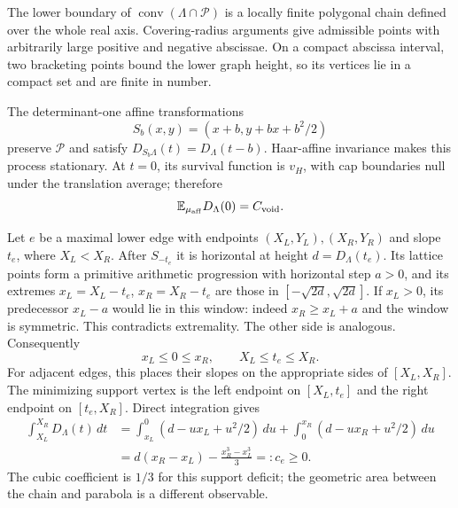 \documentclass[11pt,a4paper]{article}
\newcommand{\E}{\mathbb E}\newcommand{\Prob}{\mathbb P}
\newcommand{\Pcal}{\mathcal P}\newcommand{\Hrow}{\mathcal H}
\theoremstyle{remark}\newtheorem{remark}{Remark}
\numberwithin{equation}{section}
\begin{document}
The lower boundary of $\operatorname{conv}(\Lambda\cap\Pcal)$ is a locally finite polygonal chain defined over the whole real axis. Covering-radius arguments give admissible points with arbitrarily large positive and negative abscissae. On a compact abscissa interval, two bracketing points bound the lower graph height, so its vertices lie in a compact set and are finite in number.

The determinant-one affine transformations
\[
 S_b(x,y)=(x+b,y+bx+b^2/2)
\]
preserve $\Pcal$ and satisfy $D_{S_b\Lambda}(t)=D_\Lambda(t-b)$. Haar-affine invariance makes this process stationary. At $t=0$, its survival function is $v_H$, with cap boundaries null under the translation average; therefore
\begin{equation}\label{eq:ED}
 \E_{\mu_{\rm aff}}D_\Lambda(0)=\Cvoid.
\end{equation}

Let $e$ be a maximal lower edge with endpoints $(X_L,Y_L),(X_R,Y_R)$ and slope $t_e$, where $X_L<X_R$. After $S_{-t_e}$ it is horizontal at height $d=D_\Lambda(t_e)$. Its lattice points form a primitive arithmetic progression with horizontal step $a>0$, and its extremes $x_L=X_L-t_e$, $x_R=X_R-t_e$ are those in $[-\sqrt{2d},\sqrt{2d}]$. If $x_L>0$, its predecessor $x_L-a$ would lie in this window: indeed $x_R\ge x_L+a$ and the window is symmetric. This contradicts extremality. The other side is analogous. Consequently
\begin{equation}\label{eq:edgeposition}
 x_L\le0\le x_R,\qquad X_L\le t_e\le X_R.
\end{equation}
For adjacent edges, this places their slopes on the appropriate sides of $[X_L,X_R]$. The minimizing support vertex is the left endpoint on $[X_L,t_e]$ and the right endpoint on $[t_e,X_R]$. Direct integration gives
\begin{align}\label{eq:edgecontrib}
 \int_{X_L}^{X_R}D_\Lambda(t)\,dt
 &=\int_{x_L}^{0}(d-ux_L+u^2/2)\,du
   +\int_0^{x_R}(d-ux_R+u^2/2)\,du\nonumber\\
 &=d(x_R-x_L)-\frac{x_R^3-x_L^3}{3}=:c_e\ge0.
\end{align}
The cubic coefficient is $1/3$ for this support deficit; the geometric area between the chain and parabola is a different observable.
\end{document}
